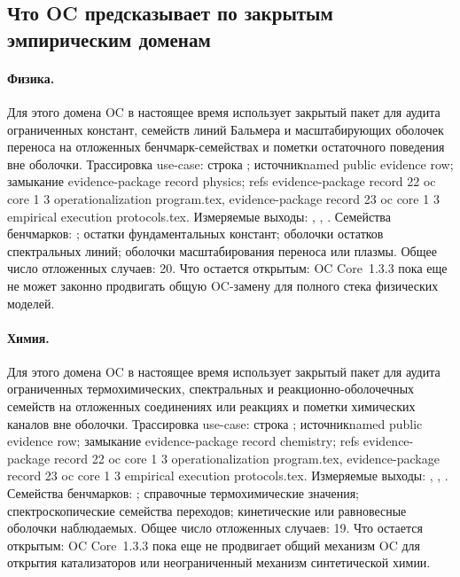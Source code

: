 \subsection{Что OC предсказывает по закрытым эмпирическим доменам}

\paragraph{Физика.}
Для этого домена OC в настоящее время использует закрытый пакет для аудита ограниченных констант, семейств линий Бальмера и масштабирующих оболочек переноса на отложенных бенчмарк-семействах и пометки остаточного поведения вне оболочки.
Трассировка use-case: строка ; \allowbreak источникnamed public evidence row; \allowbreak замыкание evidence-package record physics; \allowbreak refs evidence-package record 22 oc core 1 3 operationalization program.tex, \allowbreak evidence-package record 23 oc core 1 3 empirical execution protocols.tex.
Измеряемые выходы: , , .
Семейства бенчмарков: ; остатки фундаментальных констант; оболочки остатков спектральных линий; оболочки масштабирования переноса или плазмы.
Общее число отложенных случаев: 20.
Что остается открытым: OC Core~1.3.3 пока еще не может законно продвигать общую OC-замену для полного стека физических моделей.

\paragraph{Химия.}
Для этого домена OC в настоящее время использует закрытый пакет для аудита ограниченных термохимических, спектральных и реакционно-оболочечных семейств на отложенных соединениях или реакциях и пометки химических каналов вне оболочки.
Трассировка use-case: строка ; \allowbreak источникnamed public evidence row; \allowbreak замыкание evidence-package record chemistry; \allowbreak refs evidence-package record 22 oc core 1 3 operationalization program.tex, \allowbreak evidence-package record 23 oc core 1 3 empirical execution protocols.tex.
Измеряемые выходы: , , .
Семейства бенчмарков: ; справочные термохимические значения; спектроскопические семейства переходов; кинетические или равновесные оболочки наблюдаемых.
Общее число отложенных случаев: 19.
Что остается открытым: OC Core~1.3.3 пока еще не продвигает общий механизм OC для открытия катализаторов или неограниченный механизм синтетической химии.

